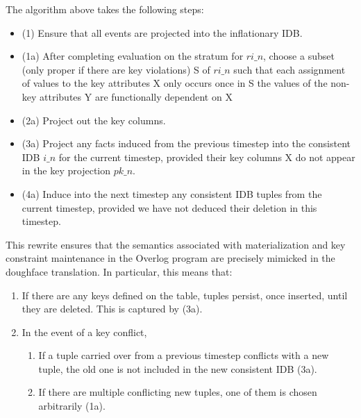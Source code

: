 The algorithm above takes the following steps:
\begin{itemize}
\item (1) Ensure that all events are projected into the inflationary IDB.
\item (1a) After completing evaluation on the stratum for $ri\_n$, choose a subset (only proper if there are key violations) S of $ri\_n$ such that
each assignment of values to the key attributes X only occurs once in S
the values of the non-key attributes Y are functionally dependent on X
\item (2a) Project out the key columns.
\item (3a) Project any facts induced from the previous timestep into the consistent IDB $i\_n$ for the current timestep, provided their key columns X do not appear in the key projection $pk\_n$.
\item (4a) Induce into the next timestep any consistent IDB tuples from the current timestep, provided we have not deduced their deletion in this timestep.
\end{itemize}

This rewrite ensures that the semantics associated with materialization and key constraint maintenance in the Overlog program are precisely mimicked in the doughface translation. In particular, this means that:

\begin{enumerate}
\item If there are any keys defined on the table, tuples persist, once inserted, until they are deleted. This is captured by (3a).
\item In the event of a key conflict,
\begin{enumerate}
	\item If a tuple carried over from a previous timestep conflicts with a new tuple, the old one is not included in the new consistent IDB (3a).
	\item If there are multiple conflicting new tuples, one of them is chosen arbitrarily (1a).
\end{enumerate}
\end{enumerate}